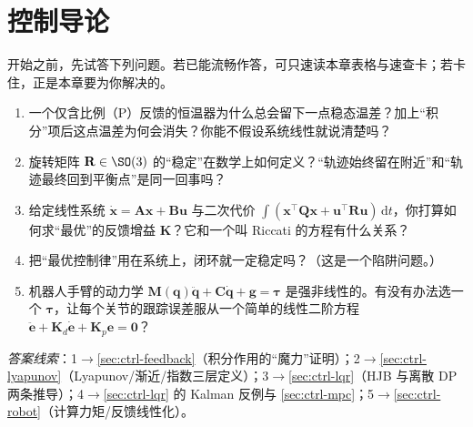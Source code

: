 \chapter{控制导论}
\label{ch:control}



\begin{practice}[前置自测]
开始之前，先试答下列问题。若已能流畅作答，可只速读本章表格与速查卡；若卡住，正是本章要为你解决的。
\begin{enumerate}
  \item 一个仅含比例（P）反馈的恒温器为什么总会留下一点稳态温差？加上“积分”项后这点温差为何会消失？你能不假设系统线性就说清楚吗？
  \item 旋转矩阵 $\mathbf{R}\in\SO(3)$ 的“稳定”在数学上如何定义？“轨迹始终留在附近”和“轨迹最终回到平衡点”是同一回事吗？
  \item 给定线性系统 $\dot{\mathbf{x}}=\mathbf{A}\mathbf{x}+\mathbf{B}\mathbf{u}$ 与二次代价 $\int(\mathbf{x}^\top\mathbf{Q}\mathbf{x}+\mathbf{u}^\top\mathbf{R}\mathbf{u})\,\mathrm dt$，你打算如何求“最优”的反馈增益 $\mathbf{K}$？它和一个叫 Riccati 的方程有什么关系？
  \item 把“最优控制律”用在系统上，闭环就一定稳定吗？（这是一个陷阱问题。）
  \item 机器人手臂的动力学 $\mathbf{M}(\mathbf{q})\ddot{\mathbf{q}}+\mathbf{C}\dot{\mathbf{q}}+\mathbf{g}=\boldsymbol{\tau}$ 是强非线性的。有没有办法选一个 $\boldsymbol{\tau}$，让每个关节的跟踪误差服从一个简单的线性二阶方程 $\ddot{\mathbf{e}}+\mathbf{K}_d\dot{\mathbf{e}}+\mathbf{K}_p\mathbf{e}=\mathbf{0}$？
\end{enumerate}
\noindent\emph{答案线索}：1$\to$\cref{sec:ctrl-feedback}（积分作用的“魔力”证明）；2$\to$\cref{sec:ctrl-lyapunov}（Lyapunov/渐近/指数三层定义）；3$\to$\cref{sec:ctrl-lqr}（HJB 与离散 DP 两条推导）；4$\to$\cref{sec:ctrl-lqr} 的 Kalman 反例与 \cref{sec:ctrl-mpc}；5$\to$\cref{sec:ctrl-robot}（计算力矩/反馈线性化）。
\end{practice}

